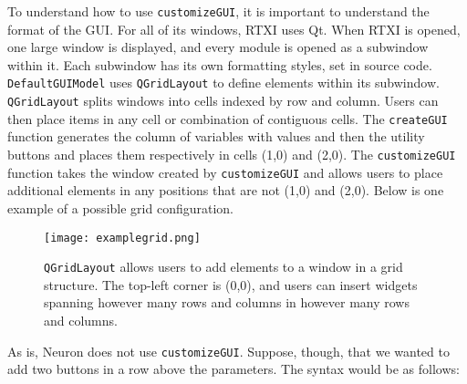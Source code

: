 To understand how to use \texttt{customizeGUI}, it is important to understand the format of the GUI. For all of its windows, RTXI uses Qt. When RTXI is opened, one large window is displayed, and every module is opened as a subwindow within it. Each subwindow has its own formatting styles, set in source code. \texttt{DefaultGUIModel} uses \texttt{QGridLayout} to define elements within its subwindow. \texttt{QGridLayout} splits windows into cells indexed by row and column. Users can then place items in any cell or combination of contiguous cells. The \texttt{createGUI} function generates the column of variables with values and then the utility buttons and places them respectively in cells (1,0) and (2,0). The \texttt{customizeGUI} function takes the window created by \texttt{customizeGUI} and allows users to place additional elements in any positions that are not (1,0) and (2,0). Below is one example of a possible grid configuration.

\begin{figure}[h!] 
\begin{center}
\label{QGridLayout}
\texttt{[image: examplegrid.png]} 
\caption[Example QGridLayout]{\texttt{QGridLayout} allows users to add elements to a window in a grid structure. The top-left corner is (0,0), and users can insert widgets spanning however many rows and columns in however many rows and columns.} 
\end{center}
\end{figure}

As is, Neuron does not use \texttt{customizeGUI}. Suppose, though, that we wanted to add two buttons in a row above the parameters. The syntax would be as follows:

